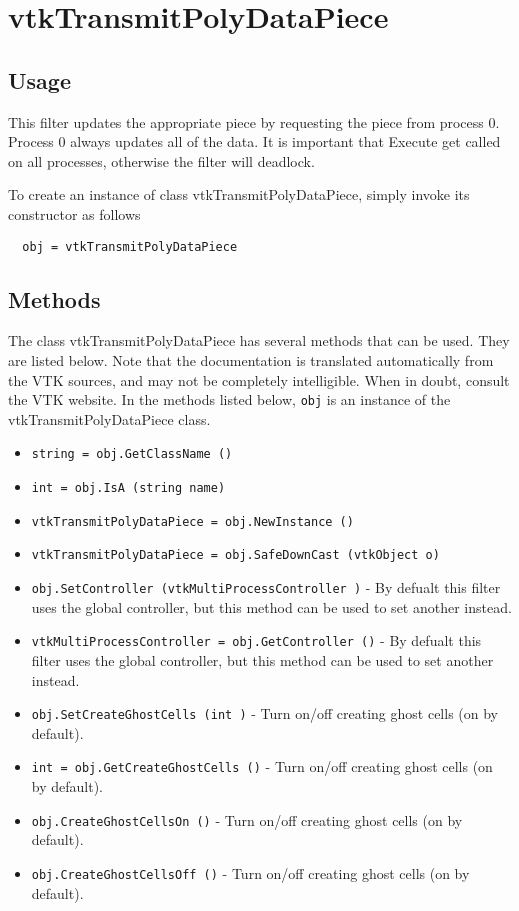 \section{vtkTransmitPolyDataPiece}

\subsection{Usage}

 This filter updates the appropriate piece by requesting the piece from 
 process 0.  Process 0 always updates all of the data.  It is important that 
 Execute get called on all processes, otherwise the filter will deadlock.

To create an instance of class vtkTransmitPolyDataPiece, simply
invoke its constructor as follows
\begin{verbatim}
  obj = vtkTransmitPolyDataPiece
\end{verbatim}
\subsection{Methods}

The class vtkTransmitPolyDataPiece has several methods that can be used.
  They are listed below.
Note that the documentation is translated automatically from the VTK sources,
and may not be completely intelligible.  When in doubt, consult the VTK website.
In the methods listed below, \verb|obj| is an instance of the vtkTransmitPolyDataPiece class.
\begin{itemize}
\item  \verb|string = obj.GetClassName ()|

\item  \verb|int = obj.IsA (string name)|

\item  \verb|vtkTransmitPolyDataPiece = obj.NewInstance ()|

\item  \verb|vtkTransmitPolyDataPiece = obj.SafeDownCast (vtkObject o)|

\item  \verb|obj.SetController (vtkMultiProcessController )| -  By defualt this filter uses the global controller,
 but this method can be used to set another instead.

\item  \verb|vtkMultiProcessController = obj.GetController ()| -  By defualt this filter uses the global controller,
 but this method can be used to set another instead.

\item  \verb|obj.SetCreateGhostCells (int )| -  Turn on/off creating ghost cells (on by default).

\item  \verb|int = obj.GetCreateGhostCells ()| -  Turn on/off creating ghost cells (on by default).

\item  \verb|obj.CreateGhostCellsOn ()| -  Turn on/off creating ghost cells (on by default).

\item  \verb|obj.CreateGhostCellsOff ()| -  Turn on/off creating ghost cells (on by default).

\end{itemize}
